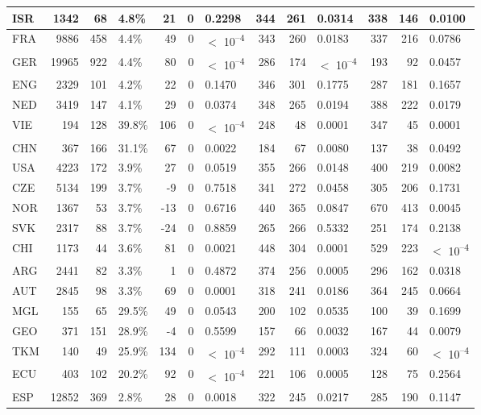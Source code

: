 \begin{tabular}{l|r|r|l|r|r|l|r|r|l|r|r|l}
\hline
ISR & 1342 & 68 & 4.8\% & 21 & 0 & 0.2298 & 344 & 261 & 0.0314 & 338 & 146 & 0.0100\\
\hline
FRA & 9886 & 458 & 4.4\% & 49 & 0 & $<$ 10\textsuperscript{--4} & 343 & 260 & 0.0183 & 337 & 216 & 0.0786\\
\hline
GER & 19965 & 922 & 4.4\% & 80 & 0 & $<$ 10\textsuperscript{--4} & 286 & 174 & $<$ 10\textsuperscript{--4} & 193 & 92 & 0.0457\\
\hline
ENG & 2329 & 101 & 4.2\% & 22 & 0 & 0.1470 & 346 & 301 & 0.1775 & 287 & 181 & 0.1657\\
\hline
NED & 3419 & 147 & 4.1\% & 29 & 0 & 0.0374 & 348 & 265 & 0.0194 & 388 & 222 & 0.0179\\
\hline
VIE & 194 & 128 & 39.8\% & 106 & 0 & $<$ 10\textsuperscript{--4} & 248 & 48 & 0.0001 & 347 & 45 & 0.0001\\
\hline
CHN & 367 & 166 & 31.1\% & 67 & 0 & 0.0022 & 184 & 67 & 0.0080 & 137 & 38 & 0.0492\\
\hline
USA & 4223 & 172 & 3.9\% & 27 & 0 & 0.0519 & 355 & 266 & 0.0148 & 400 & 219 & 0.0082\\
\hline
CZE & 5134 & 199 & 3.7\% & -9 & 0 & 0.7518 & 341 & 272 & 0.0458 & 305 & 206 & 0.1731\\
\hline
NOR & 1367 & 53 & 3.7\% & -13 & 0 & 0.6716 & 440 & 365 & 0.0847 & 670 & 413 & 0.0045\\
\hline
SVK & 2317 & 88 & 3.7\% & -24 & 0 & 0.8859 & 265 & 266 & 0.5332 & 251 & 174 & 0.2138\\
\hline
CHI & 1173 & 44 & 3.6\% & 81 & 0 & 0.0021 & 448 & 304 & 0.0001 & 529 & 223 & $<$ 10\textsuperscript{--4}\\
\hline
ARG & 2441 & 82 & 3.3\% & 1 & 0 & 0.4872 & 374 & 256 & 0.0005 & 296 & 162 & 0.0318\\
\hline
AUT & 2845 & 98 & 3.3\% & 69 & 0 & 0.0001 & 318 & 241 & 0.0186 & 364 & 245 & 0.0664\\
\hline
MGL & 155 & 65 & 29.5\% & 49 & 0 & 0.0543 & 200 & 102 & 0.0535 & 100 & 39 & 0.1699\\
\hline
GEO & 371 & 151 & 28.9\% & -4 & 0 & 0.5599 & 157 & 66 & 0.0032 & 167 & 44 & 0.0079\\
\hline
TKM & 140 & 49 & 25.9\% & 134 & 0 & $<$ 10\textsuperscript{--4} & 292 & 111 & 0.0003 & 324 & 60 & $<$ 10\textsuperscript{--4}\\
\hline
ECU & 403 & 102 & 20.2\% & 92 & 0 & $<$ 10\textsuperscript{--4} & 221 & 106 & 0.0005 & 128 & 75 & 0.2564\\
\hline
ESP & 12852 & 369 & 2.8\% & 28 & 0 & 0.0018 & 322 & 245 & 0.0217 & 285 & 190 & 0.1147\\

\end{tabular}
